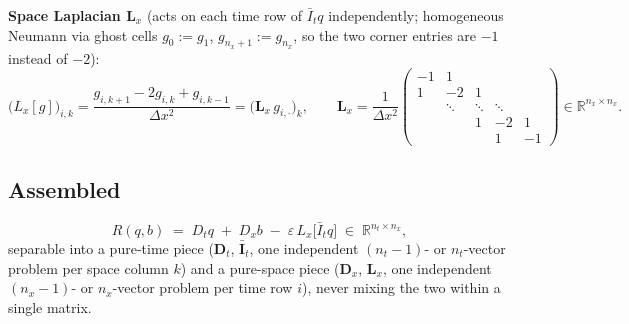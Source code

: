 \documentclass[11pt]{article}
\begin{document}
\textbf{Space Laplacian $\mathbf{L}_x$} (acts on each time row of $\bar I_t q$
independently; homogeneous Neumann via ghost cells $g_0:=g_1$, $g_{n_x+1}:=g_{n_x}$, so
the two corner entries are $-1$ instead of $-2$):
\begin{equation}
  \bigl(L_x[g]\bigr)_{i,k} = \frac{g_{i,k+1}-2g_{i,k}+g_{i,k-1}}{\Delta x^2}
  = \bigl(\mathbf{L}_x\,g_{i,\cdot}\bigr)_k,
  \qquad
  \mathbf{L}_x = \frac{1}{\Delta x^2}
  \begin{pmatrix}
    -1 & 1 & & & \\
    1 & -2 & 1 & & \\
     & \ddots & \ddots & \ddots & \\
     & & 1 & -2 & 1 \\
     & & & 1 & -1
  \end{pmatrix} \in \mathbb{R}^{n_x\times n_x}.
\end{equation}

\subsection{Assembled}

\begin{equation}
  \label{eq:R}
  R(q,b) \;=\; D_t q \;+\; D_x b \;-\; \varepsilon\, L_x\bigl[\bar I_t q\bigr]
  \;\in\; \mathbb{R}^{n_t\times n_x},
\end{equation}
separable into a pure-time piece ($\mathbf D_t$, $\bar{\mathbf I}_t$, one independent
$(n_t{-}1)$- or $n_t$-vector problem per space column $k$) and a pure-space piece
($\mathbf D_x$, $\mathbf L_x$, one independent $(n_x{-}1)$- or $n_x$-vector problem per
time row $i$), never mixing the two within a single matrix.
\end{document}
